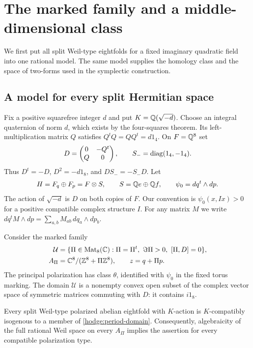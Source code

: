 \section{The marked family and a middle-dimensional class}
\label{hodge:section}

We first put all split Weil-type eightfolds for a fixed imaginary quadratic
field into one rational model.  The same model supplies the homology class
and the space of two-forms used in the symplectic construction.

\subsection{A model for every split Hermitian space}

Fix a positive squarefree integer $d$ and put $K=\mathbb Q(\sqrt{-d})$.
Choose an integral quaternion of norm $d$, which exists by the four-squares
theorem.  Its left-multiplication matrix $Q$ satisfies
$Q^tQ=QQ^t=d1_4$.  On $F=\mathbb Q^8$ set
\begin{equation}
 D=\begin{pmatrix}0&-Q^t\\Q&0\end{pmatrix},
 \qquad S_-=\operatorname{diag}(1_4,-1_4).
 \label{hodge:matrices}
\end{equation}
Thus $D^t=-D$, $D^2=-d1_8$, and $DS_-=-S_-D$.
Let
\[
 H=F_q\oplus F_p=F\otimes S,
 \qquad S=\mathbb Q e\oplus\mathbb Q f,
 \qquad \psi_0=dq^t\wedge dp.
\]
The action of $\sqrt{-d}$ is $D$ on both copies of $F$.  Our convention is
$\psi_0(x,Ix)>0$ for a positive compatible complex structure $I$.
For any matrix $M$ we write
$dq^tM\wedge dp=\sum_{a,b}M_{ab}\,dq_a\wedge dp_b$.

Consider the marked family
\begin{equation}
 \begin{split}
 \mathcal U&=\{\Pi\in\operatorname{Mat}_8(\mathbb C):
       \Pi=\Pi^t,\ \Im\Pi>0,\ [\Pi,D]=0\},\\
 A_\Pi&=\mathbb C^8/(\mathbb Z^8+\Pi\mathbb Z^8),\qquad z=q+\Pi p.
 \end{split}
 \label{hodge:period-domain}
\end{equation}
The principal polarization has class $\theta$, identified with $\psi_0$
in the fixed torus marking.  The domain $\mathcal U$ is a nonempty convex
open subset of the complex vector space of symmetric matrices commuting
with $D$: it contains $i1_8$.

\begin{proposition}
\label{hodge:isogeny-reduction}
Every split Weil-type polarized abelian eightfold with $K$-action is
$K$-compatibly isogenous to a member of \eqref{hodge:period-domain}.
Consequently, algebraicity of the full rational Weil space on every
$A_\Pi$ implies the assertion for every compatible polarization type.
\end{proposition}

